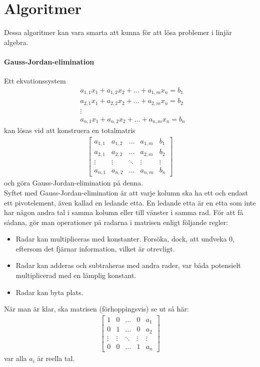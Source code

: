\twocolumn

\section{Algoritmer}
Dessa algoritmer kan vara smarta att kunna för att lösa problemer i linjär algebra.

\paragraph{Gauss-Jordan-elimination}
Ett ekvationssystem
\begin{align*}
	& a_{1,1}x_1 + a_{1,2}x_2 + ... + a_{1,m}x_n = b_1 \\
	& a_{2,1}x_1 + a_{2,2}x_2 + ... + a_{2,m}x_n = b_2 \\
	& \vdots \\
	& a_{n,1}x_1 + a_{n,2}x_2 + ... + a_{n,m}x_n = b_n
\end{align*}
kan lösas vid att konstruera en totalmatris
\begin{align*}
	\left[\begin{array}{cccc|c}
    	a_{1,1} & a_{1,2} & \dots  & a_{1,m} & b_1 \\
    	a_{2,1} & a_{2,2} & \dots  & a_{2,m} & b_2 \\
    	\vdots  & \vdots  & \ddots & \vdots  & \vdots \\
	    a_{n,1} & a_{n,2} & \dots  & a_{n,m} & b_n
	\end{array}\right]
\end{align*}
och göra Gauss-Jordan-elimination på denna. \\
Syftet med Gauss-Jordan-elimination är att varje kolumn ska ha ett och endast ett pivotelement, även kallad en ledande etta. En ledande etta är en etta som inte har någon andra tal i samma kolumn eller till vänster i samma rad. För att få sådana, gör man operationer på radarna i matrisen enligt följande regler:
\begin{itemize}
	\item Radar kan multipliceras med konstanter. Forsöka, dock, att undveka $0$, eftersom det fjärnar information, vilket är otrevligt.
	\item Radar kan adderas och subtraheras med andra rader, var båda  potensielt multiplicerad med en lämplig konstant.
	\item Radar kan byta plats.
\end{itemize}

När man är klar, ska matrisen (förhoppingsvis) se ut så här:
\begin{align*}
	\left[\begin{array}{cccc|c}
    	1      & 0      & \dots  & 0      & a_1 \\
    	0      & 1      & \dots  & 0      & a_2 \\
    	\vdots & \vdots & \ddots & \vdots & \vdots \\
	    0      & 0      & \dots  & 1      & a_n
	\end{array}\right]
\end{align*}
var alla $a_i$ är reella tal.


